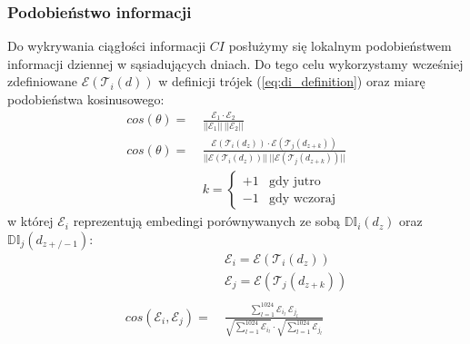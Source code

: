 \subsubsection{Podobieństwo informacji}
Do wykrywania ciągłości informacji $\mathbb{}{CI}$ posłużymy się lokalnym podobieństwem 
informacji dziennej w sąsiadujących dniach. Do tego celu wykorzystamy wcześniej zdefiniowane
$\mathcal{E}(\mathcal{T}_{i}(d))$ w definicji trójek (\ref{eq:di_definition}) 
oraz miarę podobieństwa kosinusowego:
\begin{equation}
    \begin{aligned}
        cos(\theta) = \: & 
        \frac{
            \mathcal{E}_{1} \cdot \mathcal{E}_{2}
        }
        { 
            ||\mathcal{E}_{1}|| \: ||\mathcal{E}_{2}||
        } 
        \\
        cos(\theta) = \: & 
        \frac{
            \mathcal{E}(\mathcal{T}_{i}(d_{z})) \cdot \mathcal{E}(\mathcal{T}_{j}(d_{z+k}))
        }
        {
            ||\mathcal{E}(\mathcal{T}_{i}(d_{z}))|| \: ||\mathcal{E}(\mathcal{T}_{j}(d_{z+k}))||
        } 
        \\
        & k = \begin{cases}
            +1 & \text{gdy jutro} 
            \\
            -1 & \text{gdy wczoraj}
        \end{cases}
    \end{aligned}
\end{equation}
w której $\mathcal{E}_{i}$ reprezentują embedingi porównywanych ze sobą $\mathbb{DI}_{i}(d_{z})$
oraz $\mathbb{DI}_{j}(d_{z +/- 1})$:
\begin{equation} \label{eq:cosine_e1e2}
    \begin{aligned}
        & \mathcal{E}_{i} = \mathcal{E}(\mathcal{T}_{i}(d_{z})) 
        \\
        & \mathcal{E}_{j} = \mathcal{E}(\mathcal{T}_{j}(d_{z+k})) 
        \\
        \\
        cos(\mathcal{E}_{i}, \mathcal{E}_{j}) = \: & 
        \frac{
            \sum_{l=1}^{1024} \mathcal{E}_{i_l} \: \mathcal{E}_{j_l}
        }
        {
            \sqrt{\sum_{l=1}^{1024}\mathcal{E}_{i_l}} 
            \cdot
            \sqrt{\sum_{l=1}^{1024}\mathcal{E}_{j_l}}
        }
    \end{aligned}
\end{equation}

